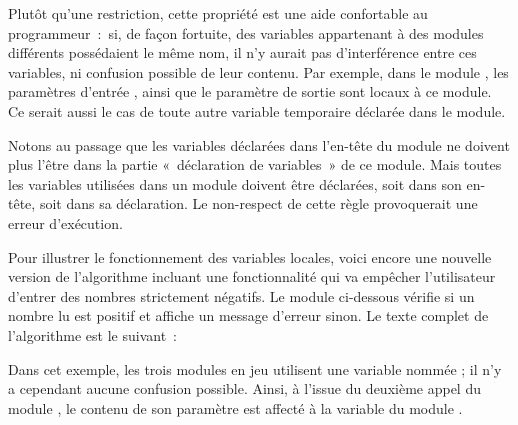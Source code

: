 	Plutôt qu’une restriction, cette propriété est
	une aide confortable au programmeur~:~si, de
	façon fortuite, des variables appartenant à des modules différents
	possédaient le même nom, il n’y aurait pas d’interférence entre ces
	variables, ni confusion possible de leur
	contenu. Par exemple, dans le module
	, les paramètres d’entrée 
	, 
	ainsi que le paramètre de sortie 
	sont locaux à ce module. 
	Ce serait aussi le cas de toute autre variable temporaire 
	déclarée dans le module.

	Notons au passage que les variables déclarées dans l’en-tête du module ne
	doivent plus l’être dans la partie «~déclaration de variables~» de ce
	module. Mais toutes les variables utilisées dans un module doivent être
	déclarées, soit dans son en-tête, soit dans sa déclaration. Le
	non-respect de cette règle provoquerait une erreur d’exécution.

	Pour illustrer le fonctionnement des variables
	locales, voici encore une nouvelle version de l’algorithme incluant une
	fonctionnalité qui va empêcher l’utilisateur d’entrer des nombres
	strictement négatifs. Le module
	 ci-dessous
	vérifie si un nombre lu est positif et affiche un message
	d’erreur sinon. Le texte complet de l’algorithme est
	le suivant~:




	Dans cet exemple, les trois modules en jeu utilisent 
	une variable nommée  ; 
	il n’y a cependant aucune confusion possible. 
	Ainsi, à l’issue du deuxième appel du module
	, 
	le contenu de son paramètre 
	est affecté à la variable 
	du module .

